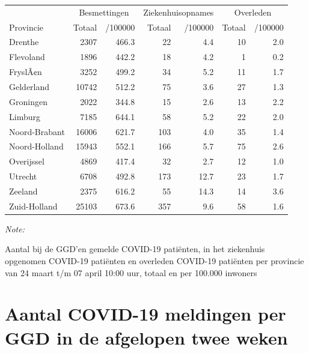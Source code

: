 \documentclass[
  english,
  man,floatsintext]{apa6}
\begin{document}
\begin{table}
\centering
\begin{threeparttable}
\begin{tabular}{lrrrrrr}
\toprule
\multicolumn{1}{c}{ } & \multicolumn{2}{c}{Besmettingen} & \multicolumn{2}{c}{Ziekenhuisopnames} & \multicolumn{2}{c}{Overleden} \\
\cmidrule(l{3pt}r{3pt}){2-3} \cmidrule(l{3pt}r{3pt}){4-5} \cmidrule(l{3pt}r{3pt}){6-7}
Provincie & Totaal & /100000 & Totaal & /100000 & Totaal & /100000\\
\midrule
Drenthe & 2307 & 466.3 & 22 & 4.4 & 10 & 2.0\\
Flevoland & 1896 & 442.2 & 18 & 4.2 & 1 & 0.2\\
FryslÃ¢n & 3252 & 499.2 & 34 & 5.2 & 11 & 1.7\\
Gelderland & 10742 & 512.2 & 75 & 3.6 & 27 & 1.3\\
Groningen & 2022 & 344.8 & 15 & 2.6 & 13 & 2.2\\
Limburg & 7185 & 644.1 & 58 & 5.2 & 22 & 2.0\\
Noord-Brabant & 16006 & 621.7 & 103 & 4.0 & 35 & 1.4\\
Noord-Holland & 15943 & 552.1 & 166 & 5.7 & 75 & 2.6\\
Overijssel & 4869 & 417.4 & 32 & 2.7 & 12 & 1.0\\
Utrecht & 6708 & 492.8 & 173 & 12.7 & 23 & 1.7\\
Zeeland & 2375 & 616.2 & 55 & 14.3 & 14 & 3.6\\
Zuid-Holland & 25103 & 673.6 & 357 & 9.6 & 58 & 1.6\\
\bottomrule
\end{tabular}
\begin{tablenotes}
\item \textit{Note: } 
\item Aantal bij de GGD’en gemelde COVID-19 patiënten, in het ziekenhuis opgenomen COVID-19 patiënten en overleden COVID-19 patiënten per provincie van 24 maart t/m 07 april 10:00 uur, totaal en per 100.000 inwoners
\end{tablenotes}
\end{threeparttable}
\end{table}

\newpage

\hypertarget{aantal-covid-19-meldingen-per-ggd-in-de-afgelopen-twee-weken}{%
\section{Aantal COVID-19 meldingen per GGD in de afgelopen twee weken}\label{aantal-covid-19-meldingen-per-ggd-in-de-afgelopen-twee-weken}}
\end{document}

